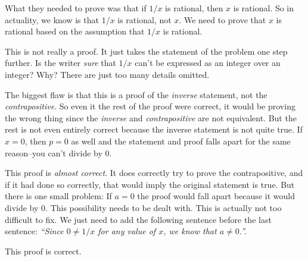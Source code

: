 \begin{eval}
\begin{answer}
\begin{pfevalenum}
What they needed to prove was that if $1/x$ is rational, then $x$ is rational.  
So in actuality, we know is that $1/x$ is rational, not $x$.  We need to prove that $x$ is
rational based on the assumption that $1/x$ is rational.
\item
This is not really a proof.  It just takes the statement of the problem one step further.
Is the writer {\em sure} that $1/x$ can't be expressed as an integer over an integer?  Why?
There are just too many details omitted.
\item
The biggest flaw is that this is a proof of the {\em inverse} statement, not the {\em contrapositive}.
So even it the rest of the proof were correct, it would be proving the wrong thing
since the {\em inverse} and {\em contrapositive} are not equivalent.  But the rest is not
even entirely correct because the inverse statement is not quite true. 
If $x=0$, then $p=0$ as well and the statement and proof falls apart for the same reason--you can't divide by $0$.
\item
This proof is {\em almost correct}.  It does correctly try to prove the contrapositive, and if it had done so
correctly, that would imply the original statement is true.  
But there is one small problem:  If $a=0$ the proof
would fall apart because it would divide by $0$.  This possibility needs to be dealt with.  
This is actually not too difficult to fix.  We just need to add the following sentence before the last sentence:
{\em ``Since $0\neq 1/x$ for any value of $x$, we know that $a\neq 0$.''.}
\item
This proof is correct.
\end{pfevalenum}
\end{answer}
\end{eval}


